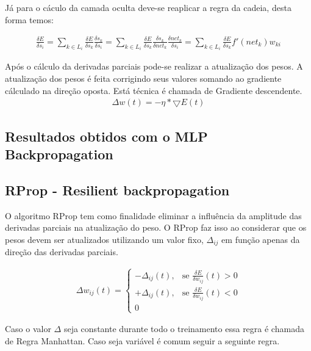 \documentclass[
	article,			%
	11pt,				%
	oneside,			%
	a4paper,			%
	english,			%
	brazil,				%
	sumario=tradicional
	]{abntex2}
\begin{document}
Já para o cáculo da camada oculta deve-se reaplicar a regra da cadeia, desta
forma temos:

\begin{align}
\frac{\delta E}{\delta s_i}=
\sum_{k \in L_i} \frac{\delta E}{\delta s_k} \frac{\delta s_k}{\delta s_i}=
\sum_{k \in L_i} \frac{\delta E}{\delta s_k} \frac{\delta s_k}{\delta net_k}
\frac{\delta net_k}{\delta s_i}=
\sum_{k \in L_i} \frac{\delta E}{\delta s_k} f'(net_k)w_{ki}
\end{align}

Após o cálculo da derivadas parciais pode-se realizar a atualização dos pesos. A
atualização dos pesos é feita corrigindo seus valores somando ao gradiente
cálculado na direção oposta. Está técnica é chamada de Gradiente descendente.
\begin{align}
\Delta w(t)=-\eta * \bigtriangledown E(t)
\end{align}
\subsection{Resultados obtidos com o MLP Backpropagation}


\subsection{RProp - Resilient backpropagation}
O algoritmo RProp tem como finalidade eliminar a influência da amplitude das
derivadas parciais na atualização do peso. O RProp faz isso ao considerar que os
pesos devem ser atualizados utilizando um valor fixo, $\Delta_{ij}$ em função
apenas da direção das derivadas parciais.

\begin{align}
\Delta w_{ij}(t) = 
\begin{cases} 
		-\Delta_{ij}(t), & \mbox{se } \frac{\delta E}{\delta w_{ij}}(t)>0 \\ 
		+\Delta_{ij}(t), & \mbox{se } \frac{\delta E}{\delta w_{ij}}(t)<0 \\
		0
\end{cases}
\end{align}

Caso o valor $\Delta$ seja constante durante todo o treinamento essa regra é
chamada de Regra Manhattan.
Caso seja variável é comum seguir a seguinte regra.
\end{document}
